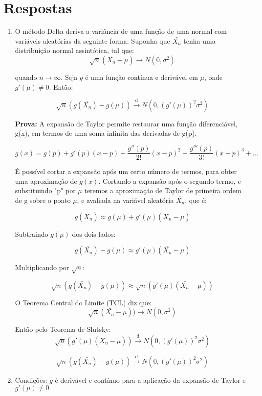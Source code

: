 \documentclass[a4paper,10pt, notitlepage]{report}
\begin{document}
	\section*{Respostas}
	\begin{enumerate}
		\item O método Delta deriva a variância de uma função de uma normal com variáveis aleatórias da seguinte forma:
		Suponha que $\bar{X_n}$ tenha uma distribuição normal assintótica, tal que:
		$$\sqrt{n}(\bar{X_n} - \mu) \rightarrow N(0, 
\sigma^2)$$
		
		quando $n \rightarrow \infty$. Seja $g$ é uma função contínua e derivável em $\mu$, onde $g'(\mu) \neq 0$. Então:
		
		$$\sqrt{n}(g(\bar{X_n}) - g(\mu)) \xrightarrow{\text{d}} N(0, (g'(\mu))^2 \sigma^2)$$
		
		\textbf{Prova:}
		A expansão de Taylor permite restaurar uma função diferenciável, g(x), em termos de uma soma infinita das derivadas de g(p).
		
		$$g(x) = g(p) + g'(p)(x-p) + \frac{g''(p)}{2!}(x-p)^2 + \frac{g'''(p)}{3!}(x-p)^3 + ...$$
		
		É possível cortar a expansão após um certo número de termos, para obter uma aproximação de $g(x)$.
		Cortando a expansão após o segundo termo, e substituindo "p" por $\mu$ teremos
		a aproximação de Taylor de primeira ordem de g sobre o ponto $\mu$, e avaliada na variável aleatória $\bar{X_n}$, que é:
		
		$$g(\bar{X_n}) \approx g(\mu) + g'(\mu)(\bar{X_n} - \mu)$$
		
		Subtraindo $g(\mu)$ dos dois lados:
		
		$$g(\bar{X_n}) - g(\mu) \approx g'(\mu)(\bar{X_n} - \mu) $$
		
		Multiplicando por $\sqrt{n}$:
		
		$$\sqrt{n}(g(\bar{X_n}) - g(\mu)) \approx \sqrt{n}(g'(\mu)(\bar{X_n} - \mu)) $$
		
		O Teorema Central do Limite (TCL) diz que:
		$$\sqrt{n}(\bar{X_n} - \mu)) \rightarrow N(0, \sigma^2)$$
		
		
		Então pelo Teorema de Slutsky:
		$$\sqrt{n}(g'(\mu)(\bar{X_n} - \mu)) \xrightarrow{\text{d}} N(0, (g'(\mu))^2 \sigma^2)$$
		
		
		$$\sqrt{n}(g(\bar{X_n}) - g(\mu)) \xrightarrow{\text{d}} N(0, (g'(\mu))^2 \sigma^2)$$
		\newpage
		
		\item Condições: $g$ é derivável e contínuo para a aplicação da expansão de Taylor e $g'(\mu) \neq 0$
		

\end{enumerate}
\end{document}

